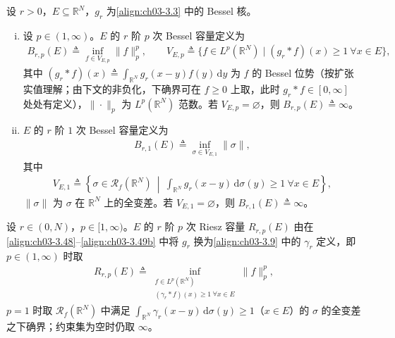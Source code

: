 \documentclass[../../main.tex]{subfiles}%
\begin{document}
\begin{definition}\label{definition:ch03-Bessel容量}
设 $r>0$，$E\subseteq\mathbb{R}^N$，$g_r$ 为\eqref{align:ch03-3.3} 中的 Bessel 核。
\begin{enumerate}[(i)]
\item 设 $p\in(1,\infty)$。$E$ 的 $r$ 阶 $p$ 次 Bessel 容量定义为
\begin{align}
B_{r,p}(E)\triangleq \inf_{f\in V_{E,p}}\|f\|_p^p,\qquad
V_{E,p}\triangleq \{f\in L^p(\mathbb{R}^N)\mid (g_r*f)(x)\geqslant1\ \forall x\in E\},\label{align:ch03-3.48}
\end{align}
其中 $(g_r*f)(x)\triangleq\int_{\mathbb{R}^N}g_r(x-y)f(y)\,\mathrm{d}y$ 为 $f$ 的 Bessel 位势（按扩张实值理解；由下文的非负化，下确界可在 $f\geqslant0$ 上取，此时 $g_r*f\in[0,\infty]$ 处处有定义），$\|\cdot\|_p$ 为 $L^p(\mathbb{R}^N)$ 范数。若 $V_{E,p}=\varnothing $，则 $B_{r,p}(E)\triangleq \infty$。
\item $E$ 的 $r$ 阶 $1$ 次 Bessel 容量定义为
\begin{align}
B_{r,1}(E)\triangleq \inf_{\sigma\in V_{E,1}}\|\sigma\|,\label{align:ch03-3.49a}
\end{align}
其中
\begin{align}
V_{E,1}\triangleq \left\{\sigma\in\mathscr{R}_f(\mathbb{R}^N)\ \middle|\ \int_{\mathbb{R}^N}g_r(x-y)\,\mathrm{d}\sigma(y)\geqslant1\ \forall x\in E\right\},\label{align:ch03-3.49b}
\end{align}
$\|\sigma\|$ 为 $\sigma$ 在 $\mathbb{R}^N$ 上的全变差。若 $V_{E,1}=\varnothing $，则 $B_{r,1}(E)\triangleq \infty$。
\end{enumerate}

设 $r\in(0,N)$，$p\in[1,\infty)$。$E$ 的 $r$ 阶 $p$ 次 Riesz 容量 $R_{r,p}(E)$ 由在\eqref{align:ch03-3.48}--\eqref{align:ch03-3.49b} 中将 $g_r$ 换为\eqref{align:ch03-3.9} 中的 $\gamma_r$ 定义，即 $p\in(1,\infty)$ 时取
\begin{align*}
R_{r,p}(E)\triangleq \inf_{\substack{f\in L^p(\mathbb{R}^N)\\ (\gamma_r*f)(x)\geqslant1\ \forall x\in E}}\|f\|_p^p,
\end{align*}
$p=1$ 时取 $\mathscr{R}_f(\mathbb{R}^N)$ 中满足 $\int_{\mathbb{R}^N}\gamma_r(x-y)\,\mathrm{d}\sigma(y)\geqslant1$（$x\in E$）的 $\sigma$ 的全变差之下确界；约束集为空时仍取 $\infty$。
\end{definition}
\end{document}
